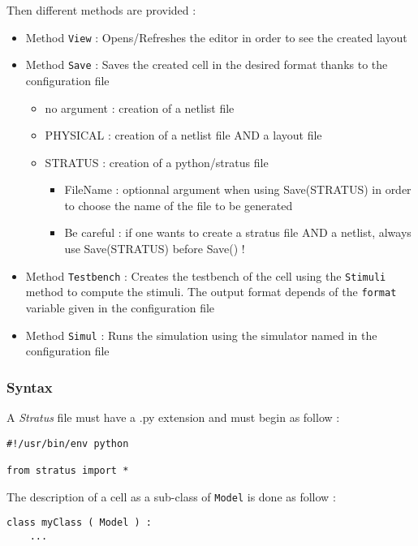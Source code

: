\indent Then different methods are provided :
\begin{itemize}
    \item Method \verb-View- : Opens/Refreshes the editor in order to see the created layout
    \item Method \verb-Save- : Saves the created cell in the desired format thanks to the configuration file
    \begin{itemize}
        \item no argument : creation of a netlist file %
        \item PHYSICAL : creation of a netlist file AND a layout file %
        \item STRATUS : creation of a python/stratus file
        \begin{itemize}
            \item FileName : optionnal argument when using Save(STRATUS) in order to choose the name of the file to be generated
            \item Be careful : if one wants to create a stratus file AND a netlist, always use Save(STRATUS) before Save() !
        \end{itemize}
    \end{itemize}
    \item Method \verb-Testbench- : Creates the testbench of the cell using the \verb-Stimuli- method to compute the stimuli. The output format depends of the \verb-format- variable given in the configuration file
    \item Method \verb-Simul- : Runs the simulation using the simulator named in the configuration file
\end{itemize}

\subsubsection{Syntax}

A \emph{Stratus} file must have a .py extension and must begin as follow :
\begin{verbatim}
#!/usr/bin/env python

from stratus import *
\end{verbatim}

\indent The description of a cell as a sub-class of \verb-Model- is done as follow :
\begin{verbatim}
class myClass ( Model ) :
    ...
\end{verbatim}
    
